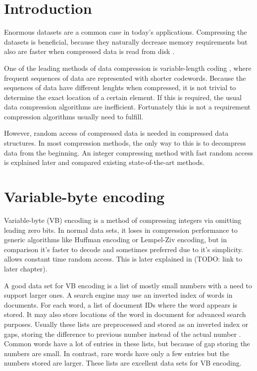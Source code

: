 \chapter{Introduction}
Enormous datasets are a common case in today's applications. Compressing the datasets is beneficial, because they 
naturally decrease memory requirements but also are faster when compressed data is read from disk \citep{Zob95}.

One of the leading methods of data compression is variable-length coding \citep{Sal99}, where frequent sequences of data
are represented with shorter codewords. Because the sequences of data have different lenghts when compressed, it is 
not trivial to determine the exact location of a certain element. If this is required, the usual data compression algorithms are
inefficient. Fortunately this is not a requirement compression algorithms usually need to fulfill. 

However, random access of compressed data is needed in compressed data structures. In most compression methods, the only way 
to this is to decompress data from the beginning. An integer compressing method with fast random access is explained later and compared
existing state-of-the-art methods.

\chapter{Variable-byte encoding}

Variable-byte (VB) encoding \citep{Wil99} is a method of compressing integers via omitting leading zero bits. In normal data sets, it loses in 
compression performance to generic algorithms like Huffman encoding or Lempel-Ziv encoding, but in comparison it's faster to decode \citep{Bri09} 
and sometimes preferred due to it's simplicity. allows constant time random access. This is later explained in (TODO: link to later chapter). 

A good data set for VB encoding is a list of mostly small numbers with a need to support larger ones. A search engine may use an inverted index of 
words in documents. For each word, a list of document IDs where the word appears is stored. It may also store locations of the word in document for 
advanced search purposes. Usually these lists are preprocessed and stored as an inverted index or gaps, storing the difference to previous number instead of the actual 
number \citep{Man08}. Common words have a lot of entries in these lists, but because of gap storing the numbers are small. In contrast, rare words 
have only a few entries but the numbers stored are larger. These lists are excellent data sets for VB encoding. 

